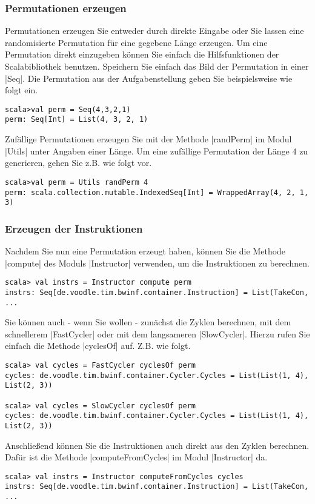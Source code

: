 \subsubsection{Permutationen erzeugen}
Permutationen erzeugen Sie entweder durch direkte Eingabe oder Sie lassen eine randomisierte Permutation für eine gegebene Länge erzeugen.
Um eine Permutation direkt einzugeben können Sie einfach die Hilfsfunktionen der Scalabibliothek benutzen.
Speichern Sie einfach das Bild der Permutation in einer |Seq|. Die Permutation aus der Aufgabenstellung geben Sie beispielsweise wie folgt ein.
\begin{lstlisting}
scala>val perm = Seq(4,3,2,1)
perm: Seq[Int] = List(4, 3, 2, 1)  
\end{lstlisting}
Zufällige Permutationen erzeugen Sie mit der Methode |randPerm| im Modul |Utils| unter Angaben einer Länge.
Um eine zufällige Permutation der Länge 4 zu generieren, gehen Sie z.B. wie folgt vor.
\begin{lstlisting}
scala>val perm = Utils randPerm 4                                                                                                 
perm: scala.collection.mutable.IndexedSeq[Int] = WrappedArray(4, 2, 1, 3)  
\end{lstlisting}
\subsubsection{Erzeugen der Instruktionen}
Nachdem Sie nun eine Permutation erzeugt haben, können Sie die Methode |compute| des Moduls |Instructor| verwenden, um die Instruktionen zu berechnen.
\begin{lstlisting}
scala> val instrs = Instructor compute perm
instrs: Seq[de.voodle.tim.bwinf.container.Instruction] = List(TakeCon, ...
\end{lstlisting}
Sie können auch - wenn Sie wollen - zunächst die Zyklen berechnen, mit dem schnellerem |FastCycler| oder mit dem langsameren |SlowCycler|.
Hierzu rufen Sie einfach die Methode |cyclesOf| auf. Z.B. wie folgt.
\begin{lstlisting}
scala> val cycles = FastCycler cyclesOf perm
cycles: de.voodle.tim.bwinf.container.Cycler.Cycles = List(List(1, 4), List(2, 3))

scala> val cycles = SlowCycler cyclesOf perm
cycles: de.voodle.tim.bwinf.container.Cycler.Cycles = List(List(1, 4), List(2, 3))
\end{lstlisting}
Anschließend können Sie die Instruktionen auch direkt aus den Zyklen berechnen. Dafür ist die Methode |computeFromCycles| im Modul |Instructor| da.
\begin{lstlisting}
scala> val instrs = Instructor computeFromCycles cycles
instrs: Seq[de.voodle.tim.bwinf.container.Instruction] = List(TakeCon, ...
\end{lstlisting}
